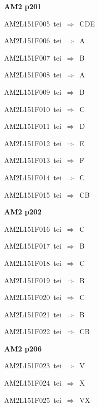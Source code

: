 \par\vfill\eject
{\bf\hfill AM2 p201\hfill\hbox{}}\par\bigskip
{\sixrm AM2L151F005\ {\sixit tei}\ }$\Rightarrow$\ CDE\par\smallskip
{\sixrm AM2L151F006\ {\sixit tei}\ }$\Rightarrow$\ A\par\smallskip
{\sixrm AM2L151F007\ {\sixit tei}\ }$\Rightarrow$\ B\par\smallskip
{\sixrm AM2L151F008\ {\sixit tei}\ }$\Rightarrow$\ A\par\smallskip
{\sixrm AM2L151F009\ {\sixit tei}\ }$\Rightarrow$\ B\par\smallskip
{\sixrm AM2L151F010\ {\sixit tei}\ }$\Rightarrow$\ C\par\smallskip
{\sixrm AM2L151F011\ {\sixit tei}\ }$\Rightarrow$\ D\par\smallskip
{\sixrm AM2L151F012\ {\sixit tei}\ }$\Rightarrow$\ E\par\smallskip
{\sixrm AM2L151F013\ {\sixit tei}\ }$\Rightarrow$\ F\par\smallskip
{\sixrm AM2L151F014\ {\sixit tei}\ }$\Rightarrow$\ C\par\smallskip
{\sixrm AM2L151F015\ {\sixit tei}\ }$\Rightarrow$\ CB\par\smallskip

\par\vfill\eject
{\bf\hfill AM2 p202\hfill\hbox{}}\par\bigskip
{\sixrm AM2L151F016\ {\sixit tei}\ }$\Rightarrow$\ C\par\smallskip
{\sixrm AM2L151F017\ {\sixit tei}\ }$\Rightarrow$\ B\par\smallskip
{\sixrm AM2L151F018\ {\sixit tei}\ }$\Rightarrow$\ C\par\smallskip
{\sixrm AM2L151F019\ {\sixit tei}\ }$\Rightarrow$\ B\par\smallskip
{\sixrm AM2L151F020\ {\sixit tei}\ }$\Rightarrow$\ C\par\smallskip
{\sixrm AM2L151F021\ {\sixit tei}\ }$\Rightarrow$\ B\par\smallskip
{\sixrm AM2L151F022\ {\sixit tei}\ }$\Rightarrow$\ CB\par\smallskip

\par\vfill\eject
{\bf\hfill AM2 p206\hfill\hbox{}}\par\bigskip
{\sixrm AM2L151F023\ {\sixit tei}\ }$\Rightarrow$\ V\par\smallskip
{\sixrm AM2L151F024\ {\sixit tei}\ }$\Rightarrow$\ X\par\smallskip
{\sixrm AM2L151F025\ {\sixit tei}\ }$\Rightarrow$\ VX\par\smallskip

